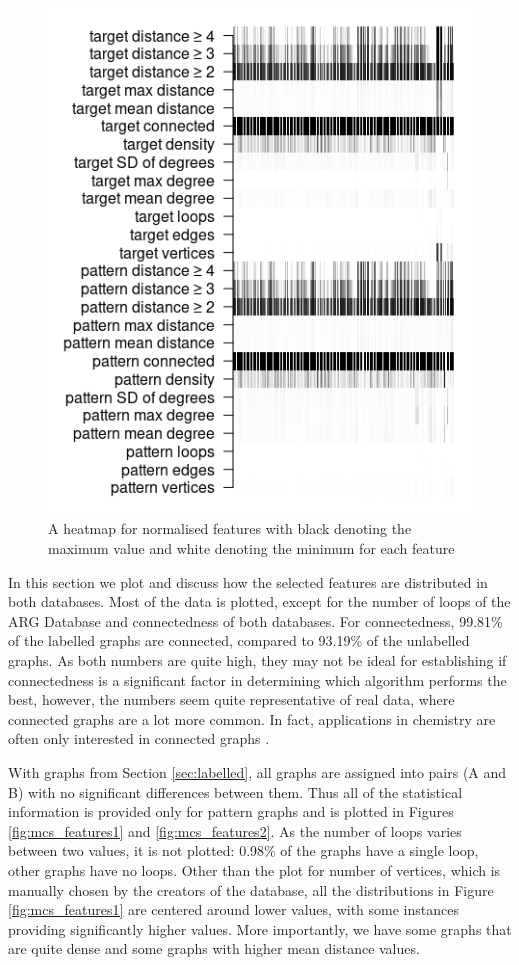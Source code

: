 \documentclass{l4proj}
\theoremstyle{definition}
\theoremstyle{remark}
\begin{document}
\begin{figure}
  \centering
  \includegraphics{images/features_heatmap.png}
  \caption{A heatmap for normalised features with black denoting the maximum
    value and white denoting the minimum for each feature}
  \label{fig:features_heatmap}
\end{figure}

In this section we plot and discuss how the selected features are distributed in
both databases. Most of the data is plotted, except for the number of loops
of the ARG Database and connectedness of both databases. For connectedness,
99.81\% of the labelled graphs are connected, compared to 93.19\% of the
unlabelled graphs. As both numbers are quite high, they may not be ideal for
establishing if connectedness is a significant factor in determining which
algorithm performs the best, however, the numbers seem quite representative of
real data, where connected graphs are a lot more common. In fact, applications
in chemistry are often only interested in connected graphs \cite{WCMS:WCMS5}.

With graphs from Section \ref{sec:labelled}, all graphs are assigned into pairs
(A and B) with no significant differences between them. Thus all of the
statistical information is provided only for pattern graphs and is plotted in
Figures \ref{fig:mcs_features1} and \ref{fig:mcs_features2}. As the number of
loops varies between two values, it is not plotted: 0.98\% of the graphs have a
single loop, other graphs have no loops. Other than the plot for number of
vertices, which is manually chosen by the creators of the database, all the
distributions in Figure \ref{fig:mcs_features1} are centered around lower
values, with some instances providing significantly higher values. More
importantly, we have some graphs that are quite dense and some graphs with
higher mean distance values.
\end{document}

